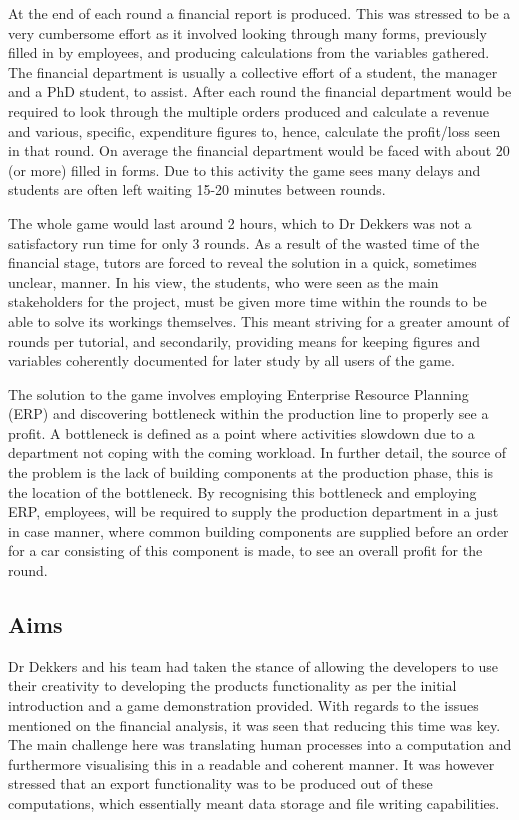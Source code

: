\documentclass{l3proj}
\begin{document}
At the end of each round a financial report is produced. This was stressed to be a very cumbersome effort as it involved looking through many forms, previously filled in by employees, and producing calculations from the variables gathered. The financial department is usually a collective effort of a student, the manager and a PhD student, to assist. After each round the financial department would be required to look through the multiple orders produced and calculate a revenue and various, specific, expenditure figures to, hence, calculate the profit/loss seen in that round. On average the financial department would be faced with about 20 (or more) filled in forms. Due to this activity the game sees many delays and students are often left waiting 15-20 minutes between rounds.

The whole game would last around 2 hours, which to Dr Dekkers was not a satisfactory run time for only 3 rounds. As a result of the wasted time of the financial stage, tutors are forced to reveal the solution in a quick, sometimes unclear, manner. In his view, the students, who were seen as the main stakeholders for the project, must be given more time within the rounds to be able to solve its workings themselves. This meant striving for a greater amount of rounds per tutorial, and secondarily, providing means for keeping figures and variables coherently documented for later study by all users of the game.

The solution to the game involves employing Enterprise Resource Planning (ERP) and discovering bottleneck within the production line to properly see a profit. A bottleneck is defined as a point where activities slowdown due to a department not coping with the coming workload. In further detail, the source of the problem is the lack of building components at the production phase, this is the location of the bottleneck. By recognising this bottleneck and employing ERP, employees, will be required to supply the production department in a just in case manner, where common building components are supplied before an order for a car consisting of this component is made, to see an overall profit for the round.

\subsection{Aims}
Dr Dekkers and his team had taken the stance of allowing the developers to use their creativity to developing the products functionality as per the initial introduction and a game demonstration provided. With regards to the issues mentioned on the financial analysis, it was seen that reducing this time was key. The main challenge here was translating human processes into a computation and furthermore visualising this in a readable and coherent manner. It was however stressed that an export functionality was to be produced out of these computations, which essentially meant data storage and file writing capabilities.
    
\end{document}
